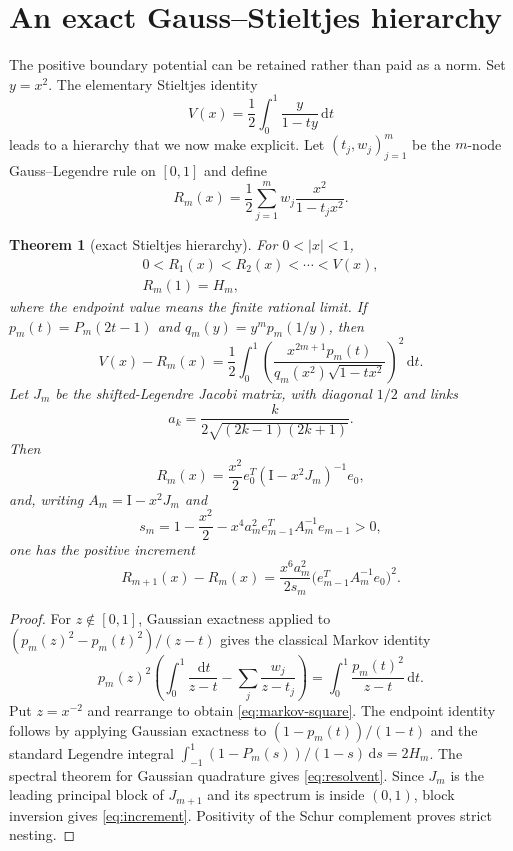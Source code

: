 \documentclass[10pt]{article}
\newtheorem{theorem}{Theorem}[section]
\newcommand{\dd}{\,\mathrm d}
\newcommand{\Id}{\mathrm I}
\begin{document}
\section{An exact Gauss--Stieltjes hierarchy}

The positive boundary potential can be retained rather than paid as a norm.
Set $y=x^2$.  The elementary Stieltjes identity
\begin{equation}\label{eq:stieltjes}
 V(x)=\frac12\int_0^1\frac{y}{1-ty}\dd t
\end{equation}
leads to a hierarchy that we now make explicit.  Let $(t_j,w_j)_{j=1}^m$ be
the $m$-node Gauss--Legendre rule on $[0,1]$ and define
\begin{equation}\label{eq:Rm}
 R_m(x)=\frac12\sum_{j=1}^mw_j\frac{x^2}{1-t_jx^2}.
\end{equation}

\begin{theorem}[exact Stieltjes hierarchy]\label{thm:stieltjes}
For $0<|x|<1$,
\begin{align}
 0<R_1(x)<R_2(x)<\cdots<V(x),\label{eq:nested}\\
 R_m(1)=H_m,\label{eq:endpoint}
\end{align}
where the endpoint value means the finite rational limit.  If
$p_m(t)=P_m(2t-1)$ and $q_m(y)=y^mp_m(1/y)$, then
\begin{equation}\label{eq:markov-square}
 V(x)-R_m(x)=\frac12\int_0^1
 \left(\frac{x^{2m+1}p_m(t)}
 {q_m(x^2)\sqrt{1-tx^2}}\right)^2\dd t.
\end{equation}
Let $J_m$ be the shifted-Legendre Jacobi matrix, with diagonal $1/2$ and
links
\[
 a_k=\frac{k}{2\sqrt{(2k-1)(2k+1)}}.
\]
Then
\begin{equation}\label{eq:resolvent}
 R_m(x)=\frac{x^2}{2}e_0^T(\Id-x^2J_m)^{-1}e_0,
\end{equation}
and, writing $A_m=\Id-x^2J_m$ and
\[
 s_m=1-\frac{x^2}{2}-x^4a_m^2e_{m-1}^TA_m^{-1}e_{m-1}>0,
\]
one has the positive increment
\begin{equation}\label{eq:increment}
 R_{m+1}(x)-R_m(x)=\frac{x^6a_m^2}{2s_m}
 \bigl(e_{m-1}^TA_m^{-1}e_0\bigr)^2.
\end{equation}
\end{theorem}
\begin{proof}
For $z\notin[0,1]$, Gaussian exactness applied to
$(p_m(z)^2-p_m(t)^2)/(z-t)$ gives the classical Markov identity
\[
 p_m(z)^2\left(\int_0^1\frac{\dd t}{z-t}
 -\sum_j\frac{w_j}{z-t_j}\right)
 =\int_0^1\frac{p_m(t)^2}{z-t}\dd t.
\]
Put $z=x^{-2}$ and rearrange to obtain \eqref{eq:markov-square}.
The endpoint identity follows by applying Gaussian exactness to
$(1-p_m(t))/(1-t)$ and the standard Legendre integral
$\int_{-1}^1(1-P_m(s))/(1-s)\dd s=2H_m$.
The spectral theorem for Gaussian quadrature gives \eqref{eq:resolvent}.
Since $J_m$ is the leading principal block of $J_{m+1}$ and its spectrum is
inside $(0,1)$, block inversion gives \eqref{eq:increment}.  Positivity of the
Schur complement proves strict nesting.
\end{proof}
\end{document}
